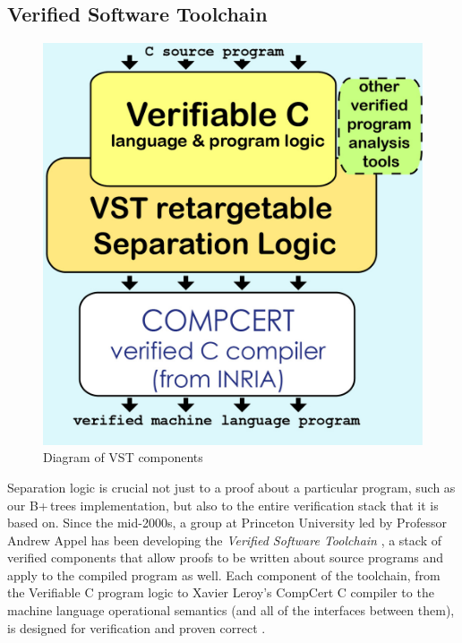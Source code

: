 \documentclass[a4paper,12pt]{article}
\begin{document}
\subsection{Verified Software Toolchain}

\begin{figure}[h]
    \begin{center}
		\includegraphics[]{b}
        \caption{Diagram of VST components \protect\cite{vst_2017}}
    \end{center}
\end{figure}

Separation logic is crucial not just to a proof about a particular program, such as our B+\,trees implementation, but also to the entire verification stack that it is based on. Since the mid-2000s, a group at Princeton University led by Professor Andrew Appel has been developing the \textit{Verified Software Toolchain} \cite{vst_2017}, a stack of verified components that allow proofs to be written about source programs and apply to the compiled program as well. Each component of the toolchain, from the Verifiable C program logic to Xavier Leroy’s CompCert C compiler to the machine language operational semantics (and all of the interfaces between them), is designed for verification and proven correct \cite{10.1007/978-3-642-19718-5_1}.
\end{document}
